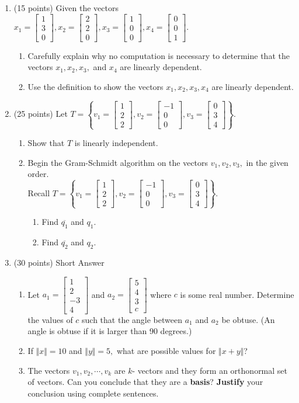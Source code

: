 \documentclass[11pt,fleqn]{article}
\def\vecthree#1#2#3{\begin{bmatrix}#1\\#2\\#3\end{bmatrix}}
\def\vecfour#1#2#3#4{\begin{bmatrix}#1\\#2\\#3\\#4\end{bmatrix}}
\begin{document}
\begin{enumerate}
\item (15 points) Given the vectors $x_1=\vecthree 1 3 0, x_2=\vecthree 2 2 0, x_3=\vecthree 1 0 0, x_4=\vecthree 0 0 1.$
	\begin{enumerate}
	\item Carefully explain why no computation is necessary to determine that the vectors $x_1,x_2,x_3,$ and $x_4$ are linearly dependent.
	\vspace{2 in}
	\item Use the definition to show the vectors $x_1,x_2,x_3, x_4$  are linearly {dependent}.
	\vfill
	\end{enumerate}
\newpage
\item (25 points) Let $T= \left\{ v_1=\vecthree 1 2 2, v_2=\vecthree {-1} 0 0, v_3= \vecthree 0 3 4 \right\}.$
	\begin{enumerate}
	\item Show that $T$ is linearly independent.
	\vfill
\newpage
	\item Begin the Gram-Schmidt algorithm on the vectors $v_1,v_2,v_3,$ in the given order.\\
Recall $T= \left\{ v_1=\vecthree 1 2 2, v_2=\vecthree {-1} 0 0, v_3= \vecthree 0 3 4 \right\}.$
		\begin{enumerate}
		\item Find $\overline{q_1}$ and $q_1.$
		\vspace{2in}\
		\item Find $\overline{q_2}$ and $q_2.$
		\vfill
		\end{enumerate}
	\end{enumerate}
\newpage
\item (30 points) Short Answer
	\begin{enumerate}
	\item  Let $a_1=\vecfour 1 2 {-3} 4$ and $a_2=\vecfour 5 4 3 c$ where $c$ is some real number. Determine the values of $c$ such that the angle between $a_1$ and $a_2$ be obtuse. (An angle is obtuse if it is larger than 90 degrees.)
	\vfill
	\item If $\Vert x \Vert=10$ and $\Vert y \Vert =5,$ what are possible values for $\Vert x+y \Vert$?
	\vfill
	\item The vectors $v_1,v_2,\cdots,v_k$ are $k$- vectors and they form an orthonormal set of vectors. Can you conclude that they are a \textbf{basis}? \textbf{Justify} your conclusion using complete sentences.

\end{enumerate}
\end{enumerate}
\end{document}
